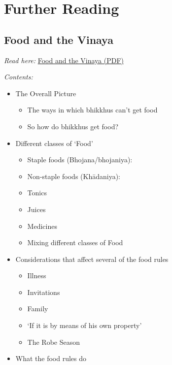 \chapter{Further Reading}

\section{Food and the Vinaya}

\emph{Read here:}
\href{https://vinaya-class.github.io/includes/docs/food-and-the-vinaya.pdf}{Food
and the Vinaya (PDF)}

\emph{Contents:}

\begin{itemize}
\tightlist
\item
  The Overall Picture

  \begin{itemize}
  \tightlist
  \item
    The ways in which bhikkhus can't get food
  \item
    So how do bhikkhus get food?
  \end{itemize}
\item
  Different classes of `Food'

  \begin{itemize}
  \tightlist
  \item
    Staple foods (Bhojana/bhojaniya):
  \item
    Non-staple foods (Khādaniya):
  \item
    Tonics
  \item
    Juices
  \item
    Medicines
  \item
    Mixing different classes of Food
  \end{itemize}
\item
  Considerations that affect several of the food rules

  \begin{itemize}
  \tightlist
  \item
    Illness
  \item
    Invitations
  \item
    Family
  \item
    `If it is by means of his own property'
  \item
    The Robe Season
  \end{itemize}
\item
  What the food rules do


\end{itemize}

